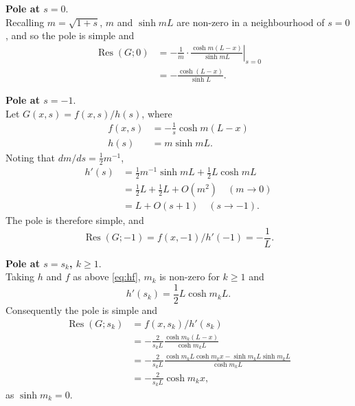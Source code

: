 \documentclass[parskip=half]{scrartcl}
\DeclareMathOperator{\Res}{Res}
\begin{document}
\textbf{Pole at $s=0$}.\\
Recalling $m=\sqrt{1+s}$, $m$ and $\sinh mL$ are non-zero in
a neighbourhood of $s=0$, and so the pole is simple and
\begin{equation}
    \begin{aligned}
        \Res(G; 0) & = - \frac{1}{m}\cdot\left.\frac{\cosh m(L-x)}{\sinh mL}\right|_{s=0}\\
                   & = - \frac{\cosh (L-x)}{\sinh L}.
    \end{aligned}
\end{equation}

\textbf{Pole at $s=-1$}.\\
Let $G(x,s)=f(x,s)/h(s)$, where
\begin{equation}
    \begin{aligned}
        f(x, s) &= -\frac{1}{s}\cosh m(L-x)\\
        h(s) &= m\sinh mL.
    \end{aligned}
    \label{eq:hf}
\end{equation}
Noting that $dm/ds = \frac{1}{2}m^{-1}$,
\begin{equation}
    \begin{aligned}
        h'(s) &= \frac{1}{2}m^{-1}\sinh mL + \frac{1}{2}L\cosh mL \\
              &= \frac{1}{2}L + \frac{1}{2}L + O(m^2) \quad(m\to 0) \\
              &= L + O(s+1) \quad(s\to -1).
    \label{eq:hprime}
    \end{aligned}
\end{equation}
The pole is therefore simple, and
\begin{equation}
    \Res(G; -1) = f(x, -1)/h'(-1) = -\frac{1}{L}.
\end{equation}

\textbf{Pole at $s=s_k$, $k \geq 1$}.\\
Taking $h$ and $f$ as above \eqref{eq:hf},
$m_k$ is non-zero for $k\geq 1$ and
\[
    h'(s_k) = \frac{1}{2}L\cosh m_kL.
\]
Consequently the pole is simple and
\begin{equation}
    \begin{aligned}
        \Res(G; s_k)
            & = f(x, s_k)/h'(s_k)\\
            & =  -\frac{2}{s_k L}\frac{\cosh m_k(L-x)}{\cosh m_kL} \\
            & =  -\frac{2}{s_k L}\frac{\cosh m_kL\cosh m_kx-\sinh m_kL\sinh m_kL}{\cosh m_kL} \\
            & =  -\frac{2}{s_k L}\cosh m_k x,
    \end{aligned}
\end{equation}
as $\sinh m_k=0$.
\end{document}
